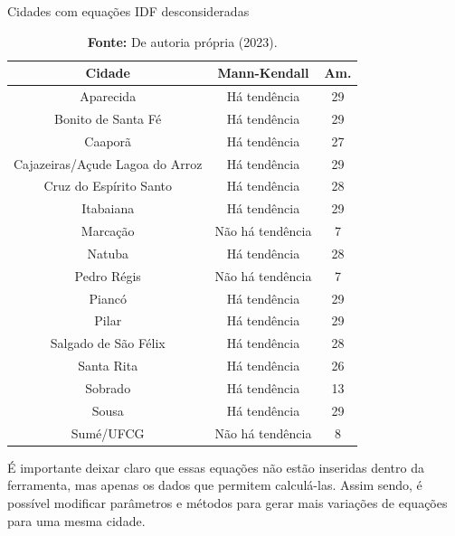 \begin{table}[ht]
\centering
\caption{Cidades com equações IDF desconsideradas}
\begin{tabular}{ccc}
\hline
\textbf{Cidade} & \textbf{Mann-Kendall} & \textbf{Am.} \\ \hline
Aparecida & Há tendência & 29 \\
Bonito de Santa Fé & Há tendência & 29 \\
Caaporã & Há tendência & 27 \\
Cajazeiras/Açude Lagoa do Arroz & Há tendência & 29 \\
Cruz do Espírito Santo & Há tendência & 28 \\
Itabaiana & Há tendência & 29 \\
Marcação & Não há tendência & 7 \\
Natuba & Há tendência & 28 \\
Pedro Régis & Não há tendência & 7 \\
Piancó & Há tendência & 29 \\
Pilar & Há tendência & 29 \\
Salgado de São Félix & Há tendência & 28 \\
Santa Rita & Há tendência & 26 \\
Sobrado & Há tendência & 13 \\
Sousa & Há tendência & 29 \\
Sumé/UFCG & Não há tendência & 8 \\ \hline
\end{tabular}
\caption*{\textbf{Fonte:} De autoria própria (2023).}
\end{table}

É importante deixar claro que essas equações não estão inseridas dentro da ferramenta, mas apenas os dados que permitem calculá-las. Assim sendo, é possível modificar parâmetros e métodos para gerar mais variações de equações para uma mesma cidade.

